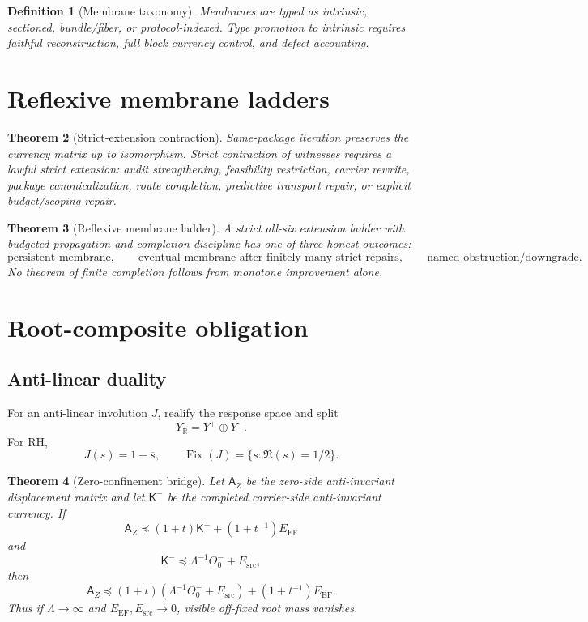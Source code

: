 \documentclass[11pt]{article}
\newtheorem{theorem}{Theorem}[section]
\newtheorem{definition}[theorem]{Definition}
\DeclareMathOperator{\Fix}{Fix}
\newcommand{\EF}{\mathrm{EF}}
\newcommand{\src}{\mathrm{src}}
\newcommand{\Loewner}{\preceq}
\begin{document}
\begin{definition}[Membrane taxonomy]
Membranes are typed as intrinsic, sectioned, bundle/fiber, or protocol-indexed.  Type promotion to intrinsic requires faithful reconstruction, full block currency control, and defect accounting.
\end{definition}

\section{Reflexive membrane ladders}

\begin{theorem}[Strict-extension contraction]
Same-package iteration preserves the currency matrix up to isomorphism.  Strict contraction of witnesses requires a lawful strict extension: audit strengthening, feasibility restriction, carrier rewrite, package canonicalization, route completion, predictive transport repair, or explicit budget/scoping repair.
\end{theorem}

\begin{theorem}[Reflexive membrane ladder]
A strict all-six extension ladder with budgeted propagation and completion discipline has one of three honest outcomes:
\[
\text{persistent membrane},\qquad
\text{eventual membrane after finitely many strict repairs},\qquad
\text{named obstruction/downgrade}.
\]
No theorem of finite completion follows from monotone improvement alone.
\end{theorem}

\section{Root-composite obligation}

\subsection{Anti-linear duality}
For an anti-linear involution \(J\), realify the response space and split
\[
  Y_{\mathbb R}=Y^+\oplus Y^-.
\]
For RH,
\[
  J(s)=1-\overline s,
  \qquad
  \Fix(J)=\{s:\Re(s)=1/2\}.
\]

\begin{theorem}[Zero-confinement bridge]
Let \(\mathsf A_Z\) be the zero-side anti-invariant displacement matrix and let \(\mathsf K^-\) be the completed carrier-side anti-invariant currency.  If
\[
  \mathsf A_Z\Loewner(1+t)\mathsf K^-+(1+t^{-1})E_{\EF}
\]
and
\[
  \mathsf K^-\Loewner\Lambda^{-1}\Theta_0^-+E_{\src},
\]
then
\[
  \mathsf A_Z\Loewner(1+t)(\Lambda^{-1}\Theta_0^-+E_{\src})+(1+t^{-1})E_{\EF}.
\]
Thus if \(\Lambda\to\infty\) and \(E_{\EF},E_{\src}\to0\), visible off-fixed root mass vanishes.
\end{theorem}
\end{document}
